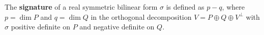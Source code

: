 The \textbf{signature} of a real symmetric bilinear form $\sigma$ is defined as $p - q$, where $p = \dim P$ and $q = \dim Q$ in the orthogonal decomposition $V = P \oplus Q \oplus V^\perp$ with $\sigma$ positive definite on $P$ and negative definite on $Q$.
